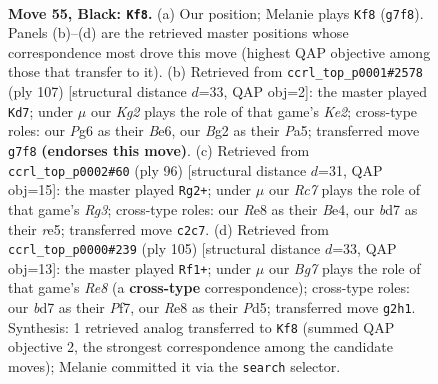 \documentclass[11pt]{article}
\begin{document}
\clearpage

\begin{figure}[p]\centering
\begin{subfigure}{0.46\textwidth}\centering
\resizebox{\linewidth}{!}{%
\newchessgame
\chessboard[
  setfen={4r3/3B1pk1/6p1/1R6/7P/1P6/2r3b1/R5K1 b - - 1 55},
  showmover=false,
  pgfstyle=straightmove, color=movearrow, markmove={g7-f8}
]}
\caption{}
\end{subfigure}\hfill
\begin{subfigure}{0.46\textwidth}\centering
\resizebox{\linewidth}{!}{%
\newchessgame
\chessboard[
  setfen={8/4kp2/4b3/p1r5/R4P2/P2B4/3K4/8 b - - 22 54},
  showmover=false,
  pgfstyle=straightmove, color=movearrow, markmove={e7-d7}
]}
\caption{}
\end{subfigure}
\\[4pt]
\begin{subfigure}{0.46\textwidth}\centering
\resizebox{\linewidth}{!}{%
\newchessgame
\chessboard[
  setfen={8/8/3bp3/4r3/2PpB2K/3P2R1/3k4/8 w - - 5 49},
  showmover=false,
  pgfstyle=straightmove, color=movearrow, markmove={g3-g2}
]}
\caption{}
\end{subfigure}\hfill
\begin{subfigure}{0.46\textwidth}\centering
\resizebox{\linewidth}{!}{%
\newchessgame
\chessboard[
  setfen={6k1/5p1p/8/3p1pP1/1P1B3R/3b4/5K2/4r3 b - - 10 53},
  showmover=false,
  pgfstyle=straightmove, color=movearrow, markmove={e1-f1}
]}
\caption{}
\end{subfigure}
\caption{\textbf{Move 55, Black: \texttt{Kf8}.} (a) Our position; Melanie plays \texttt{Kf8} (\texttt{g7f8}). Panels (b)--(d) are the retrieved master positions whose correspondence most drove this move (highest QAP objective among those that transfer to it). (b) Retrieved from \texttt{ccrl\_top\_p0001\#2578} (ply 107) [structural distance $d$=33, QAP obj=2]: the master played \texttt{Kd7}; under $\mu$ our \emph{Kg2} plays the role of that game's \emph{Ke2}; cross-type roles: our \emph{P}g6 as their \emph{B}e6, our \emph{B}g2 as their \emph{P}a5; transferred move \texttt{g7f8} \textbf{(endorses this move)}. (c) Retrieved from \texttt{ccrl\_top\_p0002\#60} (ply 96) [structural distance $d$=31, QAP obj=15]: the master played \texttt{Rg2+}; under $\mu$ our \emph{Rc7} plays the role of that game's \emph{Rg3}; cross-type roles: our \emph{R}e8 as their \emph{B}e4, our \emph{b}d7 as their \emph{r}e5; transferred move \texttt{c2c7}. (d) Retrieved from \texttt{ccrl\_top\_p0000\#239} (ply 105) [structural distance $d$=33, QAP obj=13]: the master played \texttt{Rf1+}; under $\mu$ our \emph{Bg7} plays the role of that game's \emph{Re8} (a \textbf{cross-type} correspondence); cross-type roles: our \emph{b}d7 as their \emph{P}f7, our \emph{R}e8 as their \emph{P}d5; transferred move \texttt{g2h1}. Synthesis: 1 retrieved analog transferred to \texttt{Kf8} (summed QAP objective 2, the strongest correspondence among the candidate moves); Melanie committed it via the \texttt{search} selector.}
\label{fig:thought-m109}
\end{figure}
\end{document}
